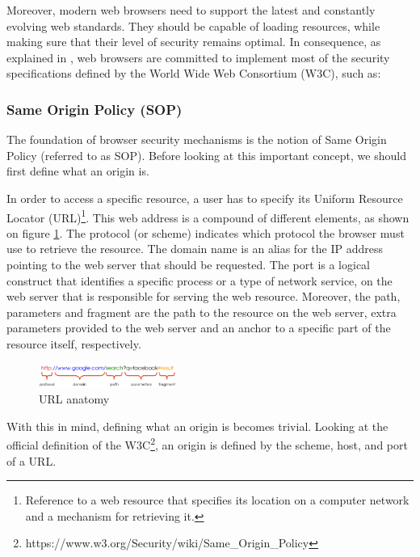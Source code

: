 \documentclass[journal]{IEEEtran}
\begin{document}
Moreover, modern web browsers need to support the latest and constantly evolving web standards. They should be capable of loading resources, while making sure that their level of security remains optimal. In consequence, as explained in \cite{browserSecurity}, web browsers are committed to implement most of the security specifications \cite{SOP} \cite{CORS} \cite{CSP} \cite{SRI} \cite{MixedContent} defined by the World Wide Web Consortium (W3C), such as:

\medskip

\subsubsection{Same Origin Policy (SOP)}

The foundation of browser security mechanisms is the notion of Same Origin Policy (referred to as SOP). Before looking at this important concept, we should first define what an origin is.

\medskip

In order to access a specific resource, a user has to specify its Uniform Resource Locator (URL)\footnote{Reference to a web resource that specifies its location on a computer network and a mechanism for retrieving it.}. This web address is a compound of different elements, as shown on figure \ref{fig:URL}. The protocol (or scheme) indicates which protocol the browser must use to retrieve the resource. The domain name is an alias for the IP address pointing to the web server that should be requested. The port is a logical construct that identifies a specific process or a type of network service, on the web server that is responsible for serving the web resource. Moreover, the path, parameters and fragment are the path to the resource on the web server, extra parameters provided to the web server and an anchor to a specific part of the resource itself, respectively.

\begin{figure}[h]
\centering
\includegraphics[width=0.4\textwidth]{images/URL.png}
\caption{URL anatomy}
\label{fig:URL}
\end{figure}

\medskip

With this in mind, defining what an origin is becomes trivial. Looking at the official definition of the W3C\footnote{https://www.w3.org/Security/wiki/Same\_Origin\_Policy}, an origin is defined by the scheme, host, and port of a URL.
\end{document}
